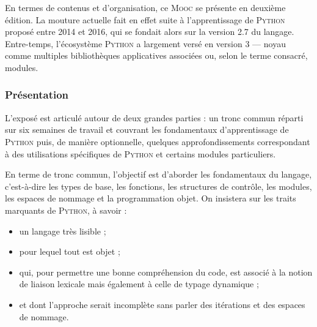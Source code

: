 En termes de contenus et d'organisation, ce \textsc{Mooc} se présente en deuxième édition. La mouture actuelle fait en effet suite à l'apprentissage de \textsc{Python} proposé entre 2014 et 2016, qui se fondait alors sur la version 2.7 du langage. Entre-temps, l'écosystème \textsc{Python} a largement versé en version 3 --- noyau comme multiples bibliothèques applicatives associées ou, selon le terme consacré, modules.

\subsubsection[Présentation]{Présentation}
\label{subsub:X.1.1.1}

L'exposé est articulé autour de deux grandes parties : un tronc commun réparti sur six semaines de travail et couvrant les fondamentaux d'apprentissage de \textsc{Python} puis, de manière optionnelle, quelques approfondissements correspondant à des utilisations spécifiques de \textsc{Python} et certains modules particuliers.

En terme de tronc commun, l'objectif est d'aborder les fondamentaux du langage, c'est-à-dire les types de base, les fonctions, les structures de contrôle, les modules, les espaces de nommage et la programmation objet. 
On insistera sur les traits marquants de \textsc{Python}, à savoir :
\begin{itemize}
	\item un langage très lisible ;
	\item pour lequel tout est objet ;
	\item qui, pour permettre une bonne compréhension du code, est associé à la notion de liaison lexicale mais également à celle de typage dynamique ;
	\item et dont l'approche serait incomplète sans parler des itérations et des espaces de nommage.
\end{itemize}

